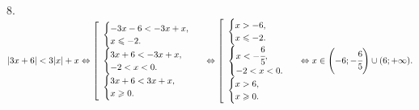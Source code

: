 8. $|3x+6|<3|x|+x \Leftrightarrow \left[\begin{array}{l}\begin{cases}-3x-6<-3x+x,\\ x\leqslant-2.\end{cases}\\ \begin{cases}3x+6<-3x+x,\\ -2<x<0.\end{cases}\\ \begin{cases}3x+6<3x+x,\\ x\geqslant0.\end{cases} \end{array}\right.\Leftrightarrow \left[\begin{array}{l}\begin{cases}x>-6,\\ x\leqslant-2.\end{cases}\\ \begin{cases}x<-\cfrac{6}{5},\\ -2<x<0.\end{cases}\\ \begin{cases}x>6,\\ x\geqslant0.\end{cases} \end{array}\right.\Leftrightarrow
x\in\left(-6;-\cfrac{6}{5}\right)\cup(6;+\infty).$\\
